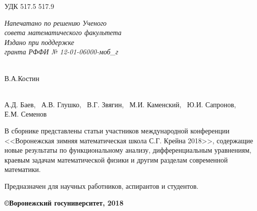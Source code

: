 \noindent УДК 517.5 517.9

\begin{flushright}
{\it Напечатано по решению Ученого \\ совета математического
факультета \\
\vspace{5mm} Издано при поддержке \\
гранта РФФИ № 12-01-06000-моб\_г }
 \end{flushright}
\vspace{15mm}{\bf Материалы работы международной конференции <<Воронежская зимняя математическая школа С.Г.
Крейна - 2018>>. Воронеж: ВГУ, 2018 -  с.}

\vspace{5mm}

 \\
В.А.Костин

\vspace{5mm}

 \\
А.Д. Баев, \  А.В. Глушко, \ В.Г. Звягин, \ М.И. Каменский, \ Ю.И. Сапронов, \\
Е.М. Семенов

\vspace{25mm}

В сборнике представлены статьи участников международной конференции <<Воронежская зимняя математическая школа С.Г. Крейна 2018>>, содержащие новые
результаты по функциональному анализу, дифференциальным уравнениям,
краевым задачам математической физики и другим разделам современной
математики.

Предназначен для научных работников, аспирантов и студентов. \\

\vspace{10mm}

\begin{flushright}
{\bf \copyright Воронежский госуниверситет, 2018}
\end{flushright}

\newpage
